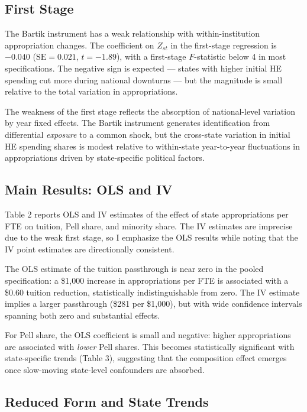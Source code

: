 \documentclass[12pt]{article}
\begin{document}
\subsection{First Stage}

The Bartik instrument has a weak relationship with within-institution appropriation changes. The coefficient on $Z_{st}$ in the first-stage regression is $-0.040$ ($\text{SE} = 0.021$, $t = -1.89$), with a first-stage $F$-statistic below 4 in most specifications. The negative sign is expected --- states with higher initial HE spending cut more during national downturns --- but the magnitude is small relative to the total variation in appropriations.

The weakness of the first stage reflects the absorption of national-level variation by year fixed effects. The Bartik instrument generates identification from differential \textit{exposure} to a common shock, but the cross-state variation in initial HE spending shares is modest relative to within-state year-to-year fluctuations in appropriations driven by state-specific political factors.

\subsection{Main Results: OLS and IV}



Table 2 reports OLS and IV estimates of the effect of state appropriations per FTE on tuition, Pell share, and minority share. The IV estimates are imprecise due to the weak first stage, so I emphasize the OLS results while noting that the IV point estimates are directionally consistent.

The OLS estimate of the tuition passthrough is near zero in the pooled specification: a \$1,000 increase in appropriations per FTE is associated with a \$0.60 tuition reduction, statistically indistinguishable from zero. The IV estimate implies a larger passthrough (\$281 per \$1,000), but with wide confidence intervals spanning both zero and substantial effects.

For Pell share, the OLS coefficient is small and negative: higher appropriations are associated with \textit{lower} Pell shares. This becomes statistically significant with state-specific trends (Table 3), suggesting that the composition effect emerges once slow-moving state-level confounders are absorbed.

\subsection{Reduced Form and State Trends}
\end{document}
